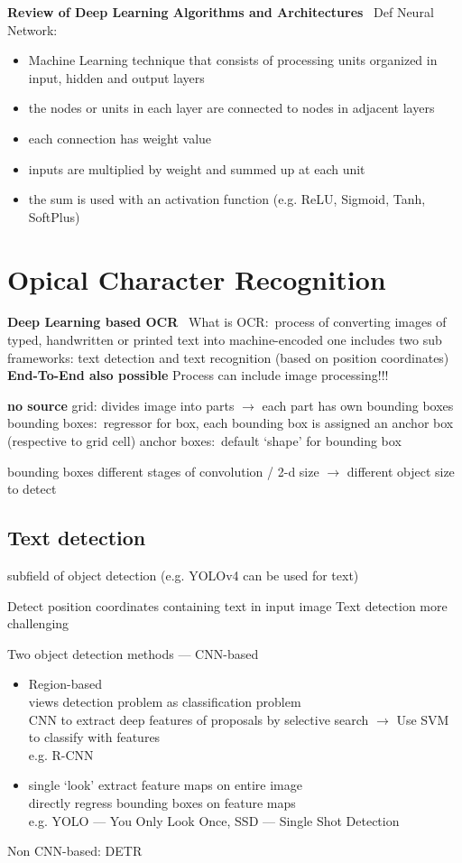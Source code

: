 \textbf{Review of Deep Learning Algorithms and Architectures}~\cite{shrestha_review_2019}
Def Neural Network:
\begin{itemize}
    \item Machine Learning technique that consists of processing units organized in input,
        hidden and output layers
    \item the nodes or units in each layer are connected to nodes in adjacent layers
    \item each connection has weight value
    \item inputs are multiplied by weight and summed up at each unit
    \item the sum is used with an activation function (e.g. ReLU, Sigmoid, Tanh, SoftPlus)
\end{itemize}

\section{Opical Character Recognition}

\textbf{Deep Learning based OCR}~\cite{zhao_improving_2020}
What is OCR:\ process of converting images of typed, handwritten or printed text into machine-encoded one
includes two sub frameworks: text detection and text recognition (based on position coordinates)
\textbf{End-To-End also possible}
Process can include image processing!!!


\textbf{no source}
grid: divides image into parts $\rightarrow$ each part has own bounding boxes
bounding boxes:~regressor for box, each bounding box is assigned an anchor box (respective to grid cell)
anchor boxes:~default `shape' for bounding box

bounding boxes different stages of convolution / 2-d size $\rightarrow$ different object size to detect

\subsection{Text detection}
subfield of object detection (e.g. YOLOv4 can be used for text)

Detect position coordinates containing text in input image
Text detection more challenging

Two object detection methods --- CNN-based
\begin{itemize}
    \item Region-based \\
        views detection problem as classification problem\\
        CNN to extract deep features of proposals by selective search $\rightarrow$  Use SVM to
            classify with features\\
        e.g. R-CNN
    \item  single `look'
        extract feature maps on entire image\\
        directly regress bounding boxes on feature maps\\
        e.g. YOLO --- You Only Look Once, SSD --- Single Shot Detection
\end{itemize}
Non CNN-based: DETR

